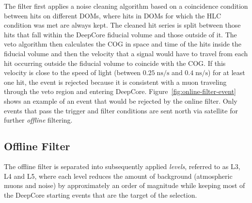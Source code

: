 The filter first applies a noise cleaning algorithm based on a coincidence condition between hits on different DOMs, where hits in DOMs for which the HLC condition was met are always kept. The cleaned hit series is split between those hits that fall within the DeepCore fiducial volume and those outside of it. The veto algorithm then calculates the COG in space and time of the hits inside the fiducial volume and then the velocity that a signal would have to travel from each hit occurring outside the fiducial volume to coincide with the COG. If this velocity is close to the speed of light (between $0.25\;\mathrm{ns/s}$ and $0.4\;\mathrm{ns/s}$) for at least one hit, the event is rejected because it is consistent with a muon traveling through the veto region and entering DeepCore. Figure~\ref{fig:online-filter-event} shows an example of an event that would be rejected by the online filter. Only events that pass the trigger and filter conditions are sent north via satellite for further \emph{offline} filtering.

\subsection{Offline Filter}
\label{sec:offline-filter}
The offline filter is separated into subsequently applied \emph{levels}, referred to as L3, L4 and L5, where each level reduces the amount of background (atmospheric muons and noise) by approximately an order of magnitude while keeping most of the DeepCore starting events that are the target of the selection.

